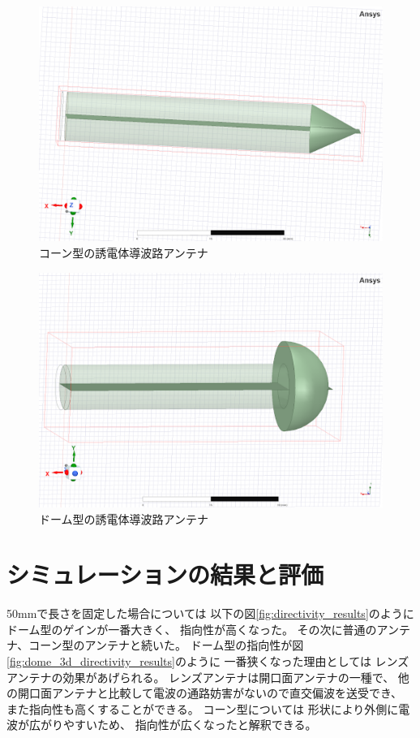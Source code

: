 \documentclass[technicalreport]{ieicej}
\begin{document}
\begin{figure}[tb]
  \begin{center}
    \includegraphics[bb=0 0 384 262, width=0.7\linewidth]{img/cone.pdf}
    \caption{コーン型の誘電体導波路アンテナ}
    \label{fig:cone}
  \end{center}
\end{figure}

\begin{figure}[tb]
  \begin{center}
    \includegraphics[bb=0 0 384 262, width=0.7\linewidth]{img/dome.pdf}
    \caption{ドーム型の誘電体導波路アンテナ}
    \label{fig:dome}
  \end{center}
\end{figure}

\section{シミュレーションの結果と評価}

50mmで長さを固定した場合については
以下の図\ref{fig:directivity_results}のように
ドーム型のゲインが一番大きく、
指向性が高くなった。
その次に普通のアンテナ、コーン型のアンテナと続いた。
ドーム型の指向性が図\ref{fig:dome_3d_directivity_results}のように
一番狭くなった理由としては
レンズアンテナの効果があげられる。
レンズアンテナは開口面アンテナの一種で、
他の開口面アンテナと比較して電波の通路妨害がないので直交偏波を送受でき、
また指向性も高くすることができる。
コーン型については
形状により外側に電波が広がりやすいため、
指向性が広くなったと解釈できる。
\end{document}
